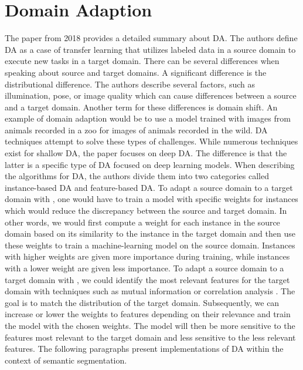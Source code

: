 \section{Domain Adaption}
The paper  \cite{Wang_2018} from 2018 provides a detailed summary about \ac{DA}. The authors define \ac{DA} as a case of transfer learning that utilizes labeled data in a source domain to execute new tasks in a target domain. There can be several differences when speaking about source and target domains. A significant difference is the distributional difference. The authors describe several factors, such as illumination, pose, or image quality which can cause differences between a source and a target domain. Another term for these differences is domain shift. An example of domain adaption would be to use a model trained with images from animals recorded in a zoo for images of animals recorded in the wild. \ac{DA} techniques attempt to solve these types of challenges. While numerous techniques exist for shallow \ac{DA}, the paper focuses on deep \ac{DA}. The difference is that the latter is a specific type of \ac{DA} focused on deep learning models. When describing the algorithms for \ac{DA}, the authors divide them into two categories called instance-based \ac{DA} and feature-based \ac{DA}.
To adapt a source domain to a target domain with , one would have to train a model with specific weights for instances which would reduce the discrepancy between the source and target domain. In other words, we would first compute a weight for each instance in the source domain based on its similarity to the instance in the target domain and then use these weights to train a machine-learning model on the source domain. Instances with higher weights are given more importance during training, while instances with a lower weight are given less importance. To adapt a source domain to a target domain with , we could identify the most relevant features for the target domain with techniques such as mutual information \cite{vergara2014review} or correlation analysis \cite{hardoon2004canonical}. The goal is to match the distribution of the target domain. Subsequently, we can increase or lower the weights to features depending on their relevance and train the model with the chosen weights. The model will then be more sensitive to the features most relevant to the target domain and less sensitive to the less relevant features. The following paragraphs present implementations of \ac{DA} within the context of semantic segmentation.

